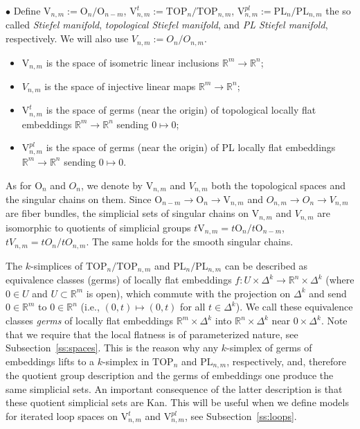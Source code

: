 \documentclass[11pt]{amsart}
\theoremstyle{definition}
\newcommand{\R}{{\mathbb R}}
\newcommand{\PL}{\mathrm{PL}}
\newcommand{\TOP}{\mathrm{TOP}}
\newcommand{\OO}{\mathrm{O}}
\newcommand{\VV}{\mathrm{V}}
\numberwithin{equation}{section}
\begin{document}
$\bullet$ Define $\VV_{n,m}:=\OO_n/\OO_{n-m}$, $\VV_{n,m}^{t}:=\TOP_n/\TOP_{n,m}$, $\VV_{n,m}^{pl}:=\PL_n/\PL_{n,m}$ the so called
{\it Stiefel manifold}, {\it topological Stiefel manifold}, and {\it PL Stiefel manifold}, respectively. We will also use $V_{n,m}:=O_n/O_{n,m}.$
\begin{itemize}
\item[-] $\VV_{n,m}$ is the space of isometric linear inclusions $\R^m\to\R^n$;
\item[-] $V_{n,m}$ is the space of injective linear maps $\R^m\to\R^n$;
\item[-] $\VV_{n,m}^t$ is the space of germs (near the origin) of topological locally flat embeddings $\R^m\to\R^n$ sending $0\mapsto 0$;
\item[-]  $\VV_{n,m}^{pl}$ is the space of germs (near the origin) of PL locally flat embeddings $\R^m\to\R^n$ sending $0\mapsto 0$.
\end{itemize}
As for $\OO_n$ and $O_n$, we denote by $\VV_{n,m}$ and $V_{n,m}$ both the topological spaces and the singular chains on them. Since 
$\OO_{n-m}\to \OO_n\to\VV_{n,m}$ and $O_{n,m}\to O_n\to V_{n,m}$ are fiber bundles, the simplicial sets of singular chains on $\VV_{n,m}$ and
$V_{n,m}$ are isomorphic to quotients of simplicial groups $t\VV_{n,m}=t\OO_n/t\OO_{n-m}$, $tV_{n,m}=tO_n/tO_{n,m}$. The same holds for the smooth 
singular chains.

 The $k$-simplices of $\TOP_n/\TOP_{n,m}$ and $\PL_n/\PL_{n,m}$
can be described as equivalence classes (germs)  of  locally flat embeddings $f\colon U\times \Delta^k\to\R^n\times\Delta^k$
(where $0\in U$ and $U\subset\R^m$ is open), which commute with the projection on $\Delta^k$ and send $0\in \R^m$ to $0\in \R^n$ (i.e., $(0,t)\mapsto (0,t)$ for all $t\in\Delta^k$). We call these equivalence classes {\it germs} of locally flat embeddings $\R^m\times\Delta^k$ into $\R^n\times\Delta^k$ near $0\times\Delta^k$. Note that we require that the local flatness is of parameterized nature, see Subsection~\ref{ss:spaces}. This is the reason why any $k$-simplex of germs of embeddings lifts to a $k$-simplex in $\TOP_n$ and $\PL_{n,m}$, respectively, and, therefore the quotient group description and the germs of embeddings one produce the same simplicial sets.  An important consequence of the latter description is that these quotient simplicial sets are Kan. This will be useful 
when we define  models for  iterated loop spaces on $\VV_{n,m}^t$ and $\VV_{n,m}^{pl}$, see Subsection~\ref{ss:loops}.
\end{document}
